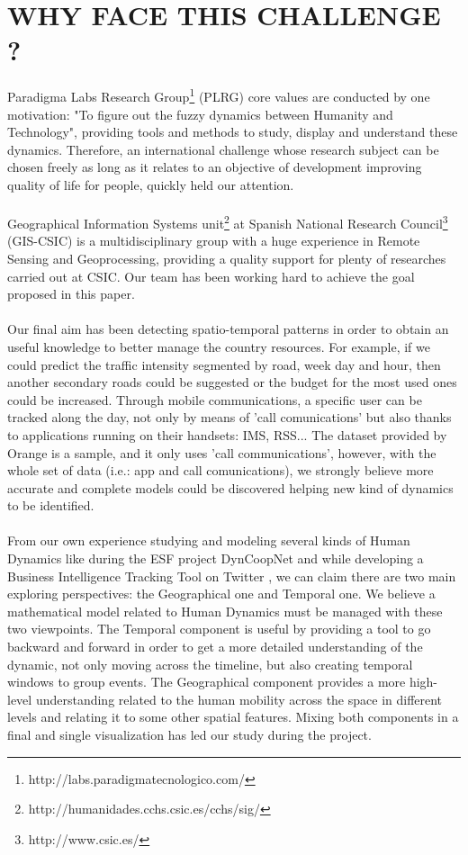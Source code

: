 \newpage

\section{WHY FACE THIS CHALLENGE ?}
Paradigma Labs Research Group\footnote{http://labs.paradigmatecnologico.com/} (PLRG) core values are conducted by one motivation: "To figure out the fuzzy dynamics between Humanity and Technology", providing tools and methods to study, display and understand these dynamics. Therefore, an international challenge whose research subject can be chosen freely as long as it relates to an objective of development improving quality of life for people, quickly held our attention.
\\
\\
Geographical Information Systems unit\footnote{http://humanidades.cchs.csic.es/cchs/sig/} at Spanish National Research Council\footnote{http://www.csic.es/} (GIS-CSIC) is a multidisciplinary group with a huge experience in Remote Sensing and Geoprocessing, providing a quality support for plenty of researches carried out at CSIC. Our team has been working hard to achieve the goal proposed in this paper.
\\
\\
Our final aim has been detecting spatio-temporal patterns in order to obtain an useful knowledge to better manage the country resources. For example, if we could predict the traffic intensity segmented by road, week day and hour, then another secondary roads could be suggested or the budget for the most used ones could be increased. Through mobile communications, a specific user can be tracked along the day, not only by means of 'call comunications' but also thanks to applications running on their handsets: IMS, RSS... The dataset provided by Orange is a sample, and it only uses 'call communications', however, with the whole set of data (i.e.: app and call comunications), we strongly believe more accurate and complete models could be discovered helping new kind of dynamics to be identified.
\\
\\
From our own experience studying and modeling several kinds of Human Dynamics like during the ESF project DynCoopNet\citep{dyncoopnet2012} and while developing a Business Intelligence Tracking Tool on Twitter \citep{labselecciones}, we can claim there are two main exploring perspectives: the Geographical one and Temporal one. We believe a mathematical model related to Human Dynamics must be managed with these two viewpoints. The Temporal component is useful by providing a tool to go backward and forward in order to get a more detailed understanding of the dynamic, not only moving across the timeline, but also creating temporal windows to group events. The Geographical component provides a more high-level understanding related to the human mobility across the space in different levels and relating it to some other spatial features. Mixing both components in a final and single visualization has led our study during the project.

